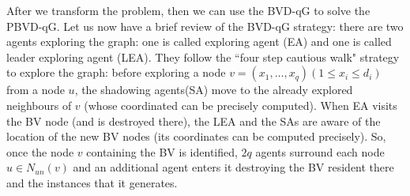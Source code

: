 After we transform the problem, then we can use the BVD-qG to solve the PBVD-qG. 
Let us  now have a brief review of the  BVD-qG strategy:  there are two agents exploring the graph: one is called exploring agent (EA) and one is called leader exploring agent (LEA). They follow the ``four step cautious walk" strategy  to explore the graph: before exploring a node $v=(x_1, \ldots, x_q) (1\leq x_i \leq d_i)$ from a node $u$, the shadowing agents(SA) move to the already explored neighbours of $v$ (whose coordinated can be precisely computed). When EA visits the BV node (and is destroyed there), the LEA and the SAs are aware of the location of the new BV nodes  (its coordinates  can be   computed precisely).
 So, once the node  $v$ containing the BV is identified, $2q$ agents surround each node $u\in N_{un}(v)$ and an additional agent enters it destroying the BV resident there and the instances that it generates. 
 


